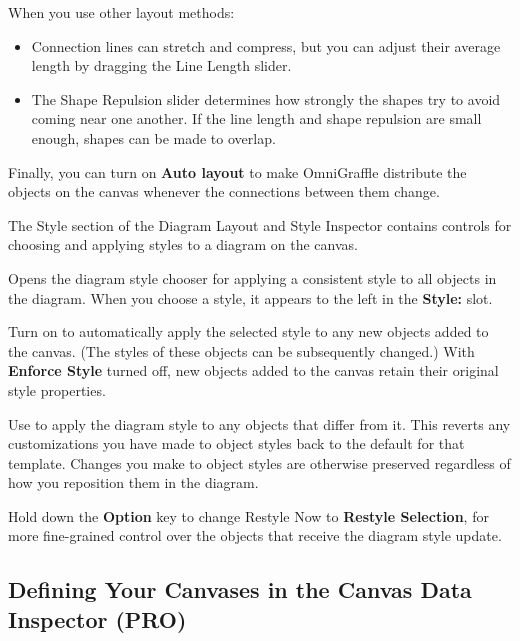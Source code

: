 \documentclass[../main.tex]{subfiles}
\begin{document}
  When you use other layout methods:

  \begin{itemize}
    \item Connection lines can stretch and compress, but you can adjust their average length by
      dragging the Line Length slider.
    \item The Shape Repulsion slider determines how strongly the shapes try to avoid coming near
      one another. If the line length and shape repulsion are small enough, shapes can be made to
      overlap.
  \end{itemize}

  Finally, you can turn on \textbf{Auto layout} to make OmniGraffle distribute the objects on the
  canvas whenever the connections between them change.


  The Style section of the Diagram Layout and Style Inspector contains controls for choosing and
  applying styles to a diagram on the canvas.

  \begin{description}[style=nextline]
    \item[{Choose\ldots{}}] Opens the diagram style chooser for applying a consistent style to all
      objects in the diagram. When you choose a style, it appears to the left in the
      \textbf{Style:} slot.
    \item[{Enforce Style}] Turn on to automatically apply the selected style to any new objects
      added to the canvas. (The styles of these objects can be subsequently changed.) With
      \textbf{Enforce Style} turned off, new objects added to the canvas retain their original
      style properties.
    \item[{Restyle Now}] Use to apply the diagram style to any objects that differ from it. This
      reverts any customizations you have made to object styles back to the default for that
      template. Changes you make to object styles are otherwise preserved regardless of how you
      reposition them in the diagram.
  \end{description}

  \begin{ogtip}
    Hold down the \textbf{Option} key to change Restyle Now to \textbf{Restyle Selection}, for more
    fine-grained control over the objects that receive the diagram style update.
  \end{ogtip}

  \subsection{Defining Your Canvases in the Canvas Data Inspector
  (\texorpdfstring{\textbf{PRO}}{PRO})}
\end{document}
